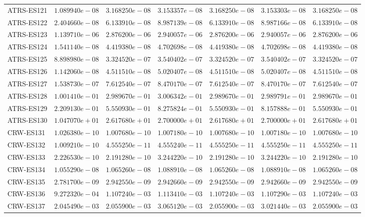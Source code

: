 \begin{longtable}{lrrrrrr}
ATRS-ES121 & $1.089940e-08$ & $3.168250e-08$ & $3.153357e-08$ & $3.168250e-08$ & $3.153303e-08$ & $3.168250e-08$ \\
ATRS-ES122 & $2.404660e-08$ & $6.133910e-08$ & $8.987139e-08$ & $6.133910e-08$ & $8.987166e-08$ & $6.133910e-08$ \\
ATRS-ES123 & $1.139710e-06$ & $2.876200e-06$ & $2.940057e-06$ & $2.876200e-06$ & $2.940057e-06$ & $2.876200e-06$ \\
ATRS-ES124 & $1.541140e-08$ & $4.419380e-08$ & $4.702698e-08$ & $4.419380e-08$ & $4.702698e-08$ & $4.419380e-08$ \\
ATRS-ES125 & $8.898980e-08$ & $3.324520e-07$ & $3.540402e-07$ & $3.324520e-07$ & $3.540402e-07$ & $3.324520e-07$ \\
ATRS-ES126 & $1.142060e-08$ & $4.511510e-08$ & $5.020407e-08$ & $4.511510e-08$ & $5.020407e-08$ & $4.511510e-08$ \\
ATRS-ES127 & $1.538730e-07$ & $7.612540e-07$ & $8.470170e-07$ & $7.612540e-07$ & $8.470170e-07$ & $7.612540e-07$ \\
ATRS-ES128 & $1.001410e-01$ & $2.989670e-01$ & $3.006342e-01$ & $2.989670e-01$ & $2.989791e-01$ & $2.989670e-01$ \\
ATRS-ES129 & $2.209130e-01$ & $5.550930e-01$ & $8.275824e-01$ & $5.550930e-01$ & $8.157888e-01$ & $5.550930e-01$ \\
ATRS-ES130 & $1.047070e+01$ & $2.617680e+01$ & $2.700000e+01$ & $2.617680e+01$ & $2.700000e+01$ & $2.617680e+01$ \\
CRW-ES131 & $1.026380e-10$ & $1.007680e-10$ & $1.007180e-10$ & $1.007680e-10$ & $1.007180e-10$ & $1.007680e-10$ \\
CRW-ES132 & $1.009210e-10$ & $4.555250e-11$ & $4.555240e-11$ & $4.555250e-11$ & $4.555250e-11$ & $4.555250e-11$ \\
CRW-ES133 & $2.226530e-10$ & $2.191280e-10$ & $3.244220e-10$ & $2.191280e-10$ & $3.244220e-10$ & $2.191280e-10$ \\
CRW-ES134 & $1.055290e-08$ & $1.065260e-08$ & $1.088910e-08$ & $1.065260e-08$ & $1.088910e-08$ & $1.065260e-08$ \\
CRW-ES135 & $2.781700e-09$ & $2.942550e-09$ & $2.942660e-09$ & $2.942550e-09$ & $2.942660e-09$ & $2.942550e-09$ \\
CRW-ES136 & $9.272320e-04$ & $1.107240e-03$ & $1.113410e-03$ & $1.107240e-03$ & $1.107290e-03$ & $1.107240e-03$ \\
CRW-ES137 & $2.045490e-03$ & $2.055900e-03$ & $3.065120e-03$ & $2.055900e-03$ & $3.021440e-03$ & $2.055900e-03$ \\

\end{longtable}

